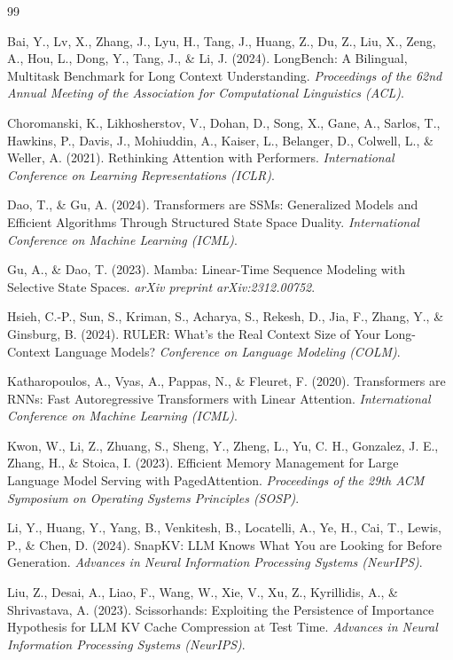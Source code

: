 \documentclass[11pt,a4paper]{article}
\begin{document}
\begin{thebibliography}{99}

Bai, Y., Lv, X., Zhang, J., Lyu, H., Tang, J., Huang, Z., Du, Z., Liu, X., Zeng, A., Hou, L., Dong, Y., Tang, J., \& Li, J. (2024). LongBench: A Bilingual, Multitask Benchmark for Long Context Understanding. \textit{Proceedings of the 62nd Annual Meeting of the Association for Computational Linguistics (ACL)}.

Choromanski, K., Likhosherstov, V., Dohan, D., Song, X., Gane, A., Sarlos, T., Hawkins, P., Davis, J., Mohiuddin, A., Kaiser, L., Belanger, D., Colwell, L., \& Weller, A. (2021). Rethinking Attention with Performers. \textit{International Conference on Learning Representations (ICLR)}.

Dao, T., \& Gu, A. (2024). Transformers are SSMs: Generalized Models and Efficient Algorithms Through Structured State Space Duality. \textit{International Conference on Machine Learning (ICML)}.

Gu, A., \& Dao, T. (2023). Mamba: Linear-Time Sequence Modeling with Selective State Spaces. \textit{arXiv preprint arXiv:2312.00752}.

Hsieh, C.-P., Sun, S., Kriman, S., Acharya, S., Rekesh, D., Jia, F., Zhang, Y., \& Ginsburg, B. (2024). RULER: What's the Real Context Size of Your Long-Context Language Models? \textit{Conference on Language Modeling (COLM)}.

Katharopoulos, A., Vyas, A., Pappas, N., \& Fleuret, F. (2020). Transformers are RNNs: Fast Autoregressive Transformers with Linear Attention. \textit{International Conference on Machine Learning (ICML)}.

Kwon, W., Li, Z., Zhuang, S., Sheng, Y., Zheng, L., Yu, C. H., Gonzalez, J. E., Zhang, H., \& Stoica, I. (2023). Efficient Memory Management for Large Language Model Serving with PagedAttention. \textit{Proceedings of the 29th ACM Symposium on Operating Systems Principles (SOSP)}.

Li, Y., Huang, Y., Yang, B., Venkitesh, B., Locatelli, A., Ye, H., Cai, T., Lewis, P., \& Chen, D. (2024). SnapKV: LLM Knows What You are Looking for Before Generation. \textit{Advances in Neural Information Processing Systems (NeurIPS)}.

Liu, Z., Desai, A., Liao, F., Wang, W., Xie, V., Xu, Z., Kyrillidis, A., \& Shrivastava, A. (2023). Scissorhands: Exploiting the Persistence of Importance Hypothesis for LLM KV Cache Compression at Test Time. \textit{Advances in Neural Information Processing Systems (NeurIPS)}.


\end{thebibliography}
\end{document}

